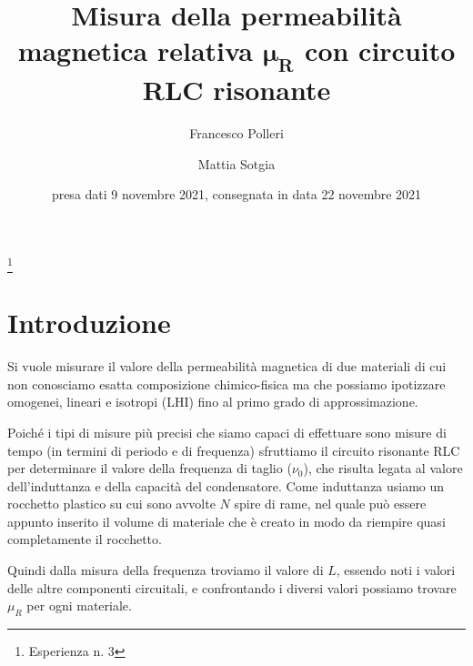 \documentclass[
    rmp,
    floatfix,
    reprint, 
    superscriptaddress, 
    altaffilletter, 
    amsmath, 
    amssymb, 
    a4paper]{revtex4-2}
\begin{document}
\title{Misura della permeabilità magnetica relativa $\mathbf{\mu_R}$ con circuito RLC risonante
}
\thanks{Esperienza n. 3
}

\author{Francesco Polleri}
\author{Mattia Sotgia}


\date{presa dati
    9 novembre 2021, consegnata in data
    22 novembre 2021
}

\begin{abstract}
    
\end{abstract}
\maketitle
\thispagestyle{fancy}


\section*{Introduzione}\label{sec:introduction}
Si vuole misurare il valore della permeabilità magnetica di due materiali di cui non conosciamo esatta composizione chimico-fisica ma che possiamo ipotizzare omogenei, lineari e isotropi (LHI) fino al primo grado di approssimazione. 

Poiché i tipi di misure più precisi che siamo capaci di effettuare sono misure di tempo (in termini di periodo e di frequenza) sfruttiamo il circuito risonante RLC per determinare il valore della frequenza di taglio ($\nu_0$), che risulta legata al valore dell'induttanza e della capacità del condensatore. Come induttanza usiamo un rocchetto plastico su cui sono avvolte $N$ spire di rame, nel quale può essere appunto inserito il volume di materiale che è creato in modo da riempire quasi completamente il rocchetto. 

Quindi dalla misura della frequenza troviamo il valore di $L$, essendo noti i valori delle altre componenti circuitali, e confrontando i diversi valori possiamo trovare $\mu_R$ per ogni materiale.
\end{document}
